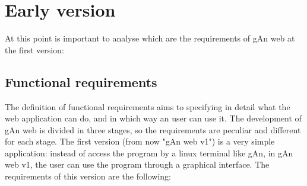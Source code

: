 
\chapter{Early version} %

\label{Chapter3} %


At this point is important to analyse which are the requirements of gAn web at the first version:

\section{Functional requirements}
The definition of functional requirements aims to specifying in detail what the web application can do, and in which way an user can use it. The development of gAn web is divided in three stages, so the requirements are peculiar and different for each stage. The first version (from now "gAn web v1") is a very simple application: instead of access the program by a linux terminal like gAn, in gAn web v1, the user can use the program through a graphical interface. 
The requirements of this version are the following:

